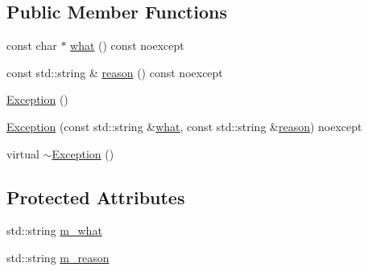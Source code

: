 \subsection*{Public Member Functions}
\begin{DoxyCompactItemize}
\item 
const char $\ast$ \hyperlink{classZeta_1_1Exception_a74d3c28b54557759fe1933c175e79dd9}{what} () const noexcept
\item 
const std\+::string \& \hyperlink{classZeta_1_1Exception_a922d1ce8c9116f72e98078cd00c97567}{reason} () const noexcept
\item 
\hyperlink{classZeta_1_1Exception_ab1dd443e8d3f4c010e5bc6ffc08d074d}{Exception} ()
\item 
\hyperlink{classZeta_1_1Exception_a98a26da907159df2cb9fc561e2872a7e}{Exception} (const std\+::string \&\hyperlink{classZeta_1_1Exception_a74d3c28b54557759fe1933c175e79dd9}{what}, const std\+::string \&\hyperlink{classZeta_1_1Exception_a922d1ce8c9116f72e98078cd00c97567}{reason}) noexcept
\item 
virtual \hyperlink{classZeta_1_1Exception_af4b74f2259dcad91e775744fedc2383c}{$\sim$\+Exception} ()
\end{DoxyCompactItemize}
\subsection*{Protected Attributes}
\begin{DoxyCompactItemize}
\item 
std\+::string \hyperlink{classZeta_1_1Exception_abdbd69ae319e0fc17cd71064882313f1}{m\+\_\+what}
\item 
std\+::string \hyperlink{classZeta_1_1Exception_a23f8475c255769b1d365927ea09dc7f7}{m\+\_\+reason}
\end{DoxyCompactItemize}


